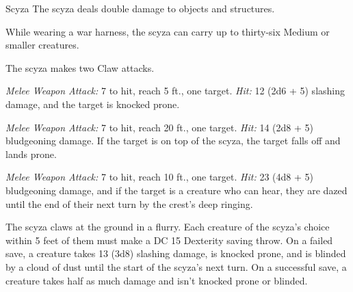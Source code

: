 \documentclass[10pt,a4paper,twoside,bg=print,twocolumn,openany,nodeprecatedcode]{dndbook}
\begin{document}
\begin{DndMonster}[float=t]{Scyza}
\DndMonsterBasics[
armor-class = {14 (natural armor)},
hit-points = {\DndDice{8d20 + 24}},
speed = {40 ft.}
]
\DndMonsterAbilityScores[
 str = 21,
 dex = 9,
 con = 17,
 int = 5,
 wis = 11,
 cha = 7
]
\DndMonsterDetails[
saving-throws = {Str +7, Con +5},
condition-immunities = {frightened},
senses = {darkvision 120 ft., passive perception 10},
challenge = 4,
]
The scyza deals double damage to objects and structures.

While wearing a war harness, the scyza can carry up to thirty-six Medium or smaller creatures.

The scyza makes two Claw attacks.

\textsl{Melee Weapon Attack:} 7 to hit, reach 5 ft., one target. \textsl{Hit:} 12 (2d6 + 5) slashing damage, and the target is knocked prone.

\textsl{Melee Weapon Attack:} 7 to hit, reach 20 ft., one target. \textsl{Hit:} 14 (2d8 + 5) bludgeoning damage. If the target is on top of the scyza, the target falls off and lands prone.

\textsl{Melee Weapon Attack:} 7 to hit, reach 10 ft., one target. \textsl{Hit:} 23 (4d8 + 5) bludgeoning damage, and if the target is a creature who can hear, they are dazed until the end of their next turn by the crest's deep ringing.

The scyza claws at the ground in a flurry. Each creature of the scyza's choice within 5 feet of them must make a DC 15 Dexterity saving throw. On a failed save, a creature takes 13 (3d8) slashing damage, is knocked prone, and is blinded by a cloud of dust until the start of the scyza's next turn. On a successful save, a creature takes half as much damage and isn't knocked prone or blinded.

\end{DndMonster}
\end{document}
